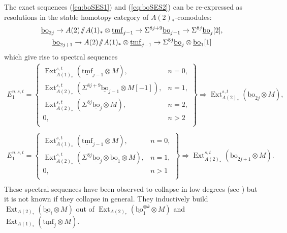 \documentclass[10pt]{amsart}
\newcommand{\sslash}{\mathbin{/\mkern-6mu/}}
\newcommand{\mmod}{\! \sslash \!}
\newcommand{\ul}[1]{\underline{#1}}
\newcommand{\tmf}{\mathrm{tmf}}
\newcommand{\bo}{\mathrm{bo}}
\newcommand{\bou}{\ul{\bo}}
\theoremstyle{definition}
\numberwithin{equation}{section}
\numberwithin{figure}{section}
\DeclareMathOperator{\Ext}{Ext}
\begin{document}
The exact sequences (\ref{eq:boSES1}) and (\ref{eq:boSES2}) can be re-expressed as resolutions in the stable homotopy category of $A(2)_*$-comodules:
\begin{gather*}
\ul{\bo}_{2j}\to A(2)\mmod A(1)_* \otimes \ul{\tmf}_{j-1}  \to \Sigma^{8j+9} \ul{\bo}_{j-1} \to \Sigma^{8j} \ul{\bo}_j[2],
\\
\ul{\bo}_{2j+1}\to A(2)\mmod A(1)_* \otimes \ul{\tmf}_{j-1} \to \Sigma^{8j} \ul{\bo}_j \otimes \ul{\bo}_1[1] 
\end{gather*}
which give rise to spectral sequences
\begin{equation}\label{eq:boIss}
\begin{split}
E_1^{n,s,t} = 
\left\{
\begin{array}{ll}
\Ext^{s,t}_{A(1)_*}(\ul{\tmf}_{j-1} \otimes M), & n = 0, \\
\Ext^{s,t}_{A(2)_*}(\Sigma^{8j+9}\bou_{j-1} \otimes M[-1]), & n = 1, \\ 
\Ext^{s,t}_{A(2)_*}(\Sigma^{8j}\bou_j \otimes M), & n = 2,  \\
0, & n > 2 \\ 
\end{array}
\right\}
\Rightarrow \Ext^{s,t}_{A(2)_*}(\bou_{2j} \otimes M), \\
\\
E_1^{n,s,t} = \left\{
\begin{array}{ll}
\Ext^{s,t}_{A(1)_*}(\ul{\tmf}_{j-1} \otimes M), & n = 0, \\
\Ext^{s,t}_{A(2)_*}(\Sigma^{8j}\bou_j \otimes \bou_1 \otimes M), & n = 1, \\
0, & n > 1 \\ 
\end{array}
\right\}
\Rightarrow \Ext^{s,t}_{A(2)_*}(\bou_{2j+1} \otimes M). \\
\end{split}
\end{equation}
These spectral sequences have been observed to collapse in low degrees (see \cite{BOSS}) but it is not known if they collapse in general.
They inductively build $\Ext_{A(2)_*}(\bou_i \otimes M)$ out of $\Ext_{A(2)_*}(\bou_1^{\otimes k} \otimes M)$ and $\Ext_{A(1)_*}(\ul{\tmf}_j \otimes M)$.
\end{document}
